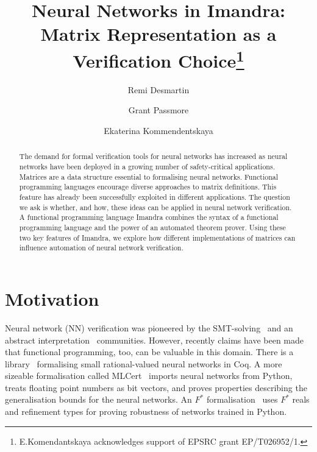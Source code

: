 \documentclass[runningheads]{llncs}
\begin{document}
%
\title{Neural Networks in Imandra: Matrix Representation as a Verification Choice\thanks{E.Komendantskaya acknowledges support of EPSRC grant EP/T026952/1.}}
%
%
\author{Remi Desmartin \and
Grant Passmore\and
Ekaterina Kommendentskaya}
%
%
%
\maketitle              %
%
\begin{abstract}
The demand for formal verification tools for neural networks has increased as neural networks have been deployed in a growing number of safety-critical applications. Matrices are a data structure essential to formalising neural networks. Functional programming languages  encourage diverse approaches to matrix definitions. This feature has already been successfully exploited in different applications. The question we ask is whether, and how, these ideas can be applied in neural network verification.
  A functional programming language Imandra combines the syntax of a functional programming language and the power of an automated theorem prover.
Using these two key features of Imandra, we explore how different implementations of matrices can influence automation of neural network verification.

\end{abstract}
%
%
%

\section{Motivation}

Neural network (NN) verification was pioneered by the
SMT-solving~\cite{KaBaDiJuKo17Reluplex,HuangKWW17} and an abstract
interpretation~\cite{SinghGPV19,GeMiDrTsChVe18,AEHW20} communities. However, recently claims have been made that functional programming, too, can be valuable in this domain. 
 There is a library~\cite{MariaBLFGRG22}
formalising small rational-valued neural networks in Coq. A more sizeable
formalisation called MLCert~\cite{BS19} imports neural networks from Python, treats
floating point numbers as bit vectors, and proves properties describing the
generalisation bounds for the neural networks.
%
An $F^*$ %
%
formalisation~\cite{KokkeKKAA20} uses $F^*$ reals and
refinement types for proving robustness of networks trained in Python.
\end{document}
